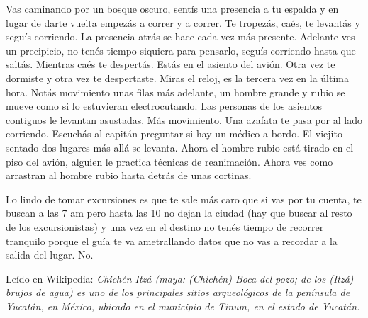 \documentclass[11pt,twoside,openright,a6paper]{book}
\begin{document}
Vas caminando por un bosque oscuro, sentís una presencia a tu espalda
y en lugar de darte vuelta empezás a correr y a correr. Te tropezás,
caés, te levantás y seguís corriendo. La presencia atrás se hace cada
vez más presente. Adelante ves un precipicio, no tenés tiempo siquiera
para pensarlo, seguís corriendo hasta que saltás. Mientras caés te
despertás. Estás en el asiento del avión. Otra vez te dormiste y otra vez
te despertaste. Miras el reloj, es la tercera vez en la última hora. Notás
movimiento unas filas más adelante, un hombre grande y rubio se mueve  como
si lo estuvieran electrocutando. Las personas de los asientos contiguos
le levantan asustadas. Más movimiento. Una azafata te pasa por al lado
corriendo. Escuchás al capitán preguntar si hay un médico a bordo. El
viejito sentado dos lugares más allá se levanta. Ahora el hombre rubio
está tirado en el piso del avión, alguien le practica técnicas de
reanimación. Ahora ves como arrastran al hombre rubio hasta detrás de
unas cortinas.


\vspace{0.5cm}
\hrulefill\hspace{0.2cm} \decofourleft\decofourright \hspace{0.2cm} \hrulefill
\vspace{0.5cm}

Lo lindo de tomar excursiones es que te sale más caro que si vas por tu
cuenta, te buscan a las 7 am pero hasta las 10 no dejan la ciudad (hay que
buscar al resto de los excursionistas) y una vez en el destino no tenés
tiempo de recorrer tranquilo porque el guía te va ametrallando datos que
no vas a recordar a la salida del lugar. No.


\vspace{0.5cm}
\hrulefill\hspace{0.2cm} \decofourleft\decofourright \hspace{0.2cm} \hrulefill
\vspace{0.5cm}

Leído en Wikipedia: \emph{Chichén Itzá (maya: (Chichén)
Boca del pozo; de los (Itzá) brujos de agua) es uno de los principales
sitios arqueológicos de la península de Yucatán, en México, ubicado en
el municipio de Tinum, en el estado de Yucatán.}


\vspace{0.5cm}
\hrulefill\hspace{0.2cm} \decofourleft\decofourright \hspace{0.2cm} \hrulefill
\vspace{0.5cm}
\end{document}
